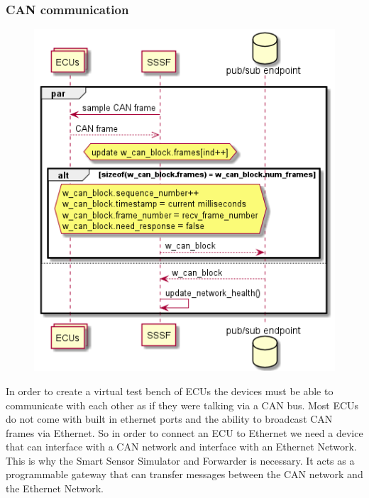 \documentclass[letterpaper,twocolumn,12pt]{article}
\begin{document}
\subsubsection{CAN communication}
\begin{figure}[t!]
    \centering
    \includegraphics[width=\linewidth]{out/images/can_exchange/can_exchange.png}
    \caption{}
    \label{fig:}
\end{figure}
In order to create a virtual test bench of ECUs the devices must be able to communicate with each other as if they were talking via a CAN bus. Most ECUs do not come with built in ethernet ports and the ability to broadcast CAN frames via Ethernet. So in order to connect an ECU to Ethernet we need a device that can interface with a CAN network and interface with an Ethernet Network. This is why the Smart Sensor Simulator and Forwarder is necessary. It acts as a programmable gateway that can transfer messages between the CAN network and the Ethernet Network.
\end{document}
